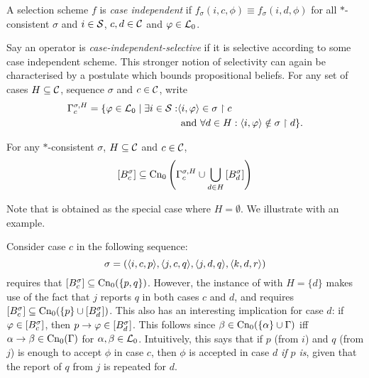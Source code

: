 \begin{definition}
    \label{kr_def_case_independent_selectivity}
    A selection scheme $f$ is \emph{case independent} if $f_\sigma(i, c, \phi)
    \equiv f_\sigma(i, d, \phi)$ for all $\ast$-consistent $\sigma$ and $i \in
    \mathcal{S}$, $c, d \in \mathcal{C}$ and $\varphi \in \mathcal{L}{}_0$.
\end{definition}

Say an operator is \emph{case-independent-selective} if it is selective
according to some case independent scheme. This stronger notion of selectivity
can again be characterised by a postulate which bounds propositional beliefs.
For any set of cases $H \subseteq \mathcal{C}$, sequence $\sigma$ and $c \in \mathcal{C}$, write
\begin{align*}
    \Gamma^{\sigma,H}_c
    = \{
        \varphi \in \mathcal{L}{}_0
        \mid
        \exists i \in \mathcal{S}:
            &\langle {i, \varphi} \rangle \in \sigma \upharpoonright c \\
            &\text{ and }
            \forall d \in H : \langle {i, \varphi} \rangle \notin \sigma \upharpoonright d
    \}.
\end{align*}

\begin{postulate}[\hboundedness{}]
    For any $\ast$-consistent $\sigma$, $H \subseteq \mathcal{C}$ and $c \in \mathcal{C}$,
    \[
        \left[{B^\sigma_c}\right]
            \subseteq
            \operatorname{Cn}_0\left(
                \Gamma^{\sigma,H}_c
                \cup
                \bigcup_{d \in H}{
                    \left[{B^\sigma_d}\right]
                }
            \right)
    \]
\end{postulate}

Note that \boundedness{} is obtained as the special case where $H =
\emptyset$. We illustrate with an example.

\begin{example}
    \label{kr_ex_hprop}
    Consider case $c$ in the following sequence:
    \[
        \sigma
        = (
            \langle {i, c, p} \rangle,
            \langle {j, c, q} \rangle,
            \langle {j, d, q} \rangle,
            \langle {k, d, r} \rangle
        )
    \]
    \boundedness{} requires that $\left[{B^\sigma_c}\right] \subseteq \operatorname{Cn}_0(\{p,
    q\})$. However, the instance of \hboundedness{} with $H = \{d\}$ makes use
    of the fact that $j$ reports $q$ in both cases $c$ and $d$, and requires
    $\left[{B^\sigma_c}\right] \subseteq \operatorname{Cn}_0(\{p\} \cup
    \left[{B^\sigma_d}\right])$.
    This also has an interesting implication for case $d$: if $\varphi \in
    \left[{B^\sigma_c}\right]$, then $p \rightarrow \varphi \in
    \left[{B^\sigma_d}\right]$. This follows since $\beta \in \operatorname{Cn}_0(\{\alpha\}
    \cup \Gamma)$ iff $\alpha \rightarrow \beta \in \operatorname{Cn}_0(\Gamma)$ for
    $\alpha, \beta \in \mathcal{L}{}_0$.
    Intuitively, this says that if $p$ (from $i$) and $q$
    (from $j$) is enough to accept $\phi$ in case $c$, then $\phi$ is
    accepted in case $d$ \emph{if $p$ is}, given that the report of $q$ from
    $j$ is repeated for $d$.

\end{example}

